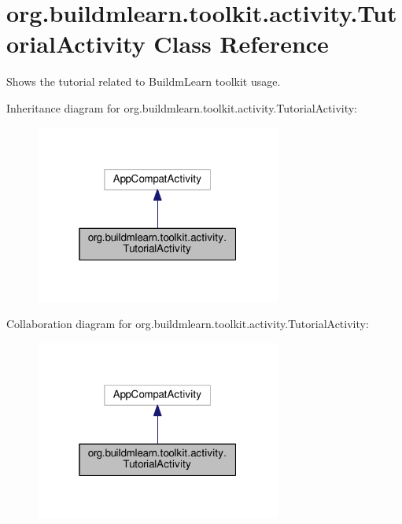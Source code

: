 \hypertarget{classorg_1_1buildmlearn_1_1toolkit_1_1activity_1_1TutorialActivity}{}\section{org.\+buildmlearn.\+toolkit.\+activity.\+Tutorial\+Activity Class Reference}
\label{classorg_1_1buildmlearn_1_1toolkit_1_1activity_1_1TutorialActivity}


Shows the tutorial related to Buildm\+Learn toolkit usage.  




Inheritance diagram for org.\+buildmlearn.\+toolkit.\+activity.\+Tutorial\+Activity\+:
\nopagebreak
\begin{figure}[H]
\begin{center}
\leavevmode
\includegraphics[width=229pt]{classorg_1_1buildmlearn_1_1toolkit_1_1activity_1_1TutorialActivity__inherit__graph}
\end{center}
\end{figure}


Collaboration diagram for org.\+buildmlearn.\+toolkit.\+activity.\+Tutorial\+Activity\+:
\nopagebreak
\begin{figure}[H]
\begin{center}
\leavevmode
\includegraphics[width=229pt]{classorg_1_1buildmlearn_1_1toolkit_1_1activity_1_1TutorialActivity__coll__graph}
\end{center}
\end{figure}
